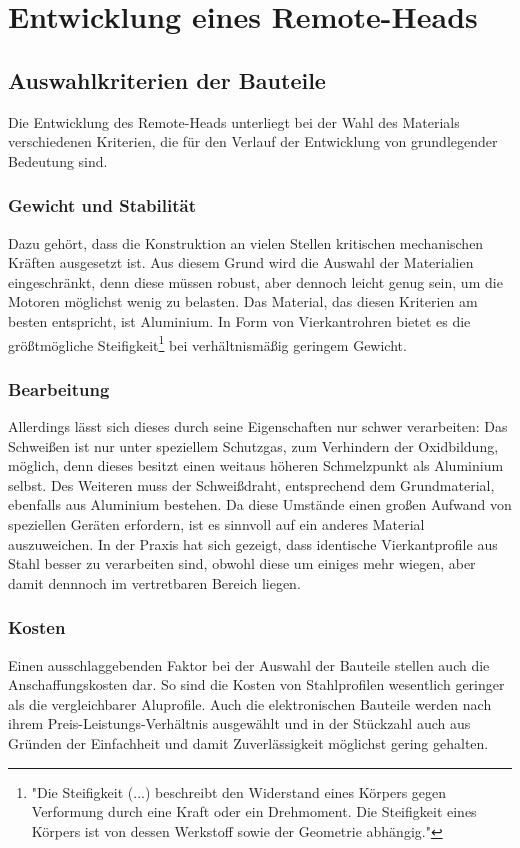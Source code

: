 \documentclass[a4paper, 12pt, bibliography=totocnumbered, listof=numbered]{scrartcl}
\begin{document}
	\section{Entwicklung eines Remote-Heads}
	\subsection{Auswahlkriterien der Bauteile}
	Die Entwicklung des Remote-Heads unterliegt bei der Wahl des Materials verschiedenen Kriterien, die für den Verlauf der Entwicklung von grundlegender Bedeutung sind.

	\subsubsection{Gewicht und Stabilität}
	Dazu gehört, dass die Konstruktion an vielen Stellen kritischen mechanischen Kräften ausgesetzt ist. Aus diesem Grund wird die Auswahl der Materialien eingeschränkt, denn diese müssen robust, aber dennoch leicht genug sein, um die Motoren möglichst wenig zu belasten. Das Material, das diesen Kriterien am besten entspricht, ist Aluminium. In Form von Vierkantrohren bietet es die größtmögliche Steifigkeit\footnote{"Die Steifigkeit (...) beschreibt den Widerstand eines Körpers gegen Verformung durch eine Kraft oder ein Drehmoment. Die Steifigkeit eines Körpers ist von dessen Werkstoff sowie der Geometrie abhängig."\cite{wikipedia-steifigkeit}} bei verhältnismäßig geringem Gewicht.

	\subsubsection{Bearbeitung}
	Allerdings lässt sich dieses durch seine Eigenschaften nur schwer verarbeiten: Das Schweißen ist nur unter speziellem Schutzgas, zum Verhindern der Oxidbildung, möglich, denn dieses besitzt einen weitaus höheren Schmelzpunkt als Aluminium selbst. Des Weiteren muss der Schweißdraht, entsprechend dem Grundmaterial, ebenfalls aus Aluminium bestehen. Da diese Umstände einen großen Aufwand von speziellen Geräten erfordern, ist es sinnvoll auf ein anderes Material auszuweichen. In der Praxis hat sich gezeigt, dass identische Vierkantprofile aus Stahl besser zu verarbeiten sind, obwohl diese um einiges mehr wiegen, aber damit dennnoch im vertretbaren Bereich liegen.

	\subsubsection{Kosten}
	Einen ausschlaggebenden Faktor bei der Auswahl der Bauteile stellen auch die Anschaffungskosten dar. So sind die Kosten von Stahlprofilen wesentlich geringer als die vergleichbarer Aluprofile. Auch die elektronischen Bauteile werden nach ihrem Preis-Leistungs-Verhältnis ausgewählt und in der Stückzahl auch aus Gründen der Einfachheit und damit Zuverlässigkeit möglichst gering gehalten.
\end{document}
